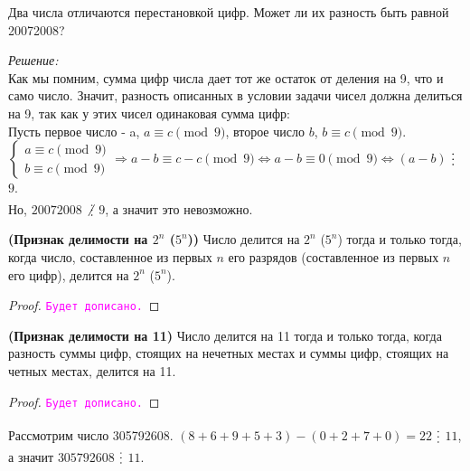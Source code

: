 \documentclass[11pt]{article}
\begin{document}
\begin{example}
	
	Два числа отличаются перестановкой цифр. Может ли их разность быть равной 20072008?
	
\end{example}
\textit{Решение:}\\
Как мы помним, сумма цифр числа дает тот же остаток от деления на 9, что и само число. Значит, разность описанных в условии задачи чисел должна делиться на 9, так как у этих чисел одинаковая сумма цифр:\\
Пусть первое число - a, $a \equiv c \pmod 9$, второе число $b$, $b \equiv c \pmod 9$.\\
$\begin{cases}a \equiv c \pmod 9 \\ b \equiv c \pmod 9 \end{cases} \Longrightarrow a - b \equiv c -c \pmod 9 \Longleftrightarrow a - b \equiv 0 \pmod 9 \Longleftrightarrow (a - b)$ $\divisible$ $9$. \\
Но, $20072008$ $\not\divisible$ $9$, а значит это невозможно.\\

\begin{theorem} \textbf{(Признак делимости на $2^n$ ($5^n$))}
	Число делится на $2^n$ ($5^n$) тогда и только тогда, когда число, составленное из первых $n$ его разрядов (составленное из первых $n$
	его цифр), делится на $2^n$ ($5^n$).

\end{theorem}
\begin{proof}
    \textcolor{magenta}{\texttt{Будет дописано.}}
\end{proof}

\begin{theorem} \textbf{(Признак делимости на 11)}
    Число делится на 11 тогда и только тогда, когда разность суммы цифр, стоящих на нечетных местах и суммы цифр, стоящих на четных местах, делится на 11.
\end{theorem}
\begin{proof}
    \textcolor{magenta}{\texttt{Будет дописано.}}
\end{proof}

\begin{example}
	Рассмотрим число 305792608. $(8 + 6 + 9 + 5 + 3) - (0 + 2 + 7 + 0) = 22$ $\divisible$ $11$, а значит $305792608$ $\divisible$ $11$.
\end{example}
\end{document}
